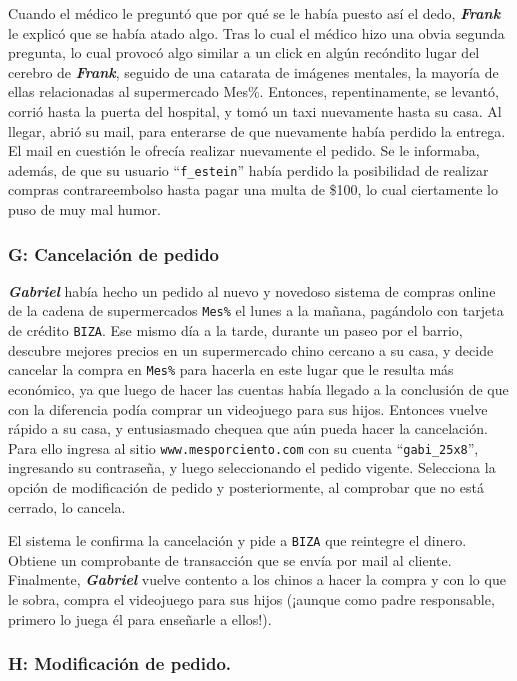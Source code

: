 Cuando el médico le preguntó que por qué se le había puesto así el dedo,
\textbf{\emph{Frank}} le explicó que se había atado algo. Tras lo cual el
médico hizo una obvia segunda pregunta, lo cual provocó algo similar a un
click en algún recóndito lugar del cerebro de \textbf{\emph{Frank}}, seguido
de una catarata de imágenes mentales, la mayoría de ellas relacionadas al
supermercado Mes\%. Entonces, repentinamente, se levantó, corrió hasta la
puerta del hospital, y tomó un taxi nuevamente hasta su casa. Al llegar, abrió
su mail, para enterarse de que nuevamente había perdido la entrega. El mail en
cuestión le ofrecía realizar nuevamente el pedido. Se le informaba, además, de
que su usuario ``\texttt{f\_estein}'' había perdido la posibilidad de realizar
compras contrareembolso hasta pagar una multa de \$100, lo cual ciertamente lo
puso de muy mal humor.

\subsubsection{G: Cancelación de pedido}

\textbf{\emph{Gabriel}} había hecho un pedido al nuevo y novedoso sistema de
compras online de la cadena de supermercados \texttt{Mes\%} el lunes a la
mañana, pagándolo con tarjeta de crédito \texttt{BIZA}. Ese mismo día a la
tarde, durante un paseo por el barrio, descubre mejores precios en un
supermercado chino cercano a su casa, y decide cancelar la compra en
\texttt{Mes\%} para hacerla en este lugar que le resulta más económico, ya que
luego de hacer las cuentas había llegado a la conclusión de que con la
diferencia podía comprar un videojuego para sus hijos. Entonces vuelve rápido
a su casa, y entusiasmado chequea que aún pueda hacer la cancelación. Para
ello ingresa al sitio \texttt{www.mesporciento.com} con su cuenta
``\texttt{gabi\_25x8}'', ingresando su contraseña, y luego seleccionando el
pedido vigente. Selecciona la opción de modificación de pedido y
posteriormente, al comprobar que no está cerrado, lo cancela.

El sistema le confirma la cancelación y pide a \texttt{BIZA} que reintegre el
dinero. Obtiene un comprobante de transacción que se envía por mail al
cliente. Finalmente, \textbf{\emph{Gabriel}} vuelve contento a los chinos a
hacer la compra y con lo que le sobra, compra el videojuego para sus hijos
(¡aunque como padre responsable, primero lo juega él para enseñarle a ellos!).

\subsubsection{H: Modificación de pedido.}

